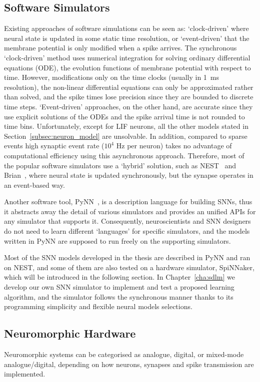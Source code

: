 \subsection{Software Simulators}
Existing approaches of software simulations can be seen as: `clock-driven' where neural state is updated in some static time resolution, or `event-driven' that the membrane potential is only modified when a spike arrives.
The synchronous `clock-driven' method uses numerical integration for solving ordinary differential equations (ODE), the evolution functions of membrane potential with respect to time.
However, modifications only on the time clocks (usually in 1~ms resolution), the non-linear differential equations can only be approximated rather than solved, and the spike times lose precision since they are bounded to discrete time steps.
`Event-driven' approaches, on the other hand, are accurate since they use explicit solutions of the ODEs and the spike arrival time is not rounded to time bins.
Unfortunately, except for LIF neurons, all the other models stated in Section~\ref{subsec:neuron_model} are unsolvable.
In addition, compared to sparse events high synaptic event rate ($10^4$ Hz per neuron) takes no advantage of computational efficiency using this asynchronous approach.
Therefore, most of the popular software simulators use a `hybrid' solution, such as NEST~\cite{gewaltig2007nest} and Brian~\cite{goodman2008brian}, where 
neural state is updated synchronously, but the synapse operates in an event-based way.

Another software tool, PyNN~\cite{davison2008pynn}, is a description language for building SNNs, thus it abstracts away the detail of various simulators and provides an unified APIs for any simulator that supports it.
Consequently, neuroscientists and SNN designers do not need to learn different `languages' for specific simulators, and the models written in PyNN are supposed to run freely on the supporting simulators.

Most of the SNN models developed in the thesis are described in PyNN and ran on NEST, and some of them are also tested on a hardware simulator, SpiNNaker, which will be introduced in the following section.
In Chapter~\ref{cha:sdlm} we develop our own SNN simulator to implement and test a proposed learning algorithm, and the simulator follows the synchronous manner thanks to its programming simplicity and flexible neural models selections. 

\subsection{Neuromorphic Hardware}
\label{subsec:neuromorphic_hw}
Neuromorphic systems can be categorised as analogue, digital, or mixed-mode analogue/digital, depending on how neurons, synapses and spike transmission are implemented. %

